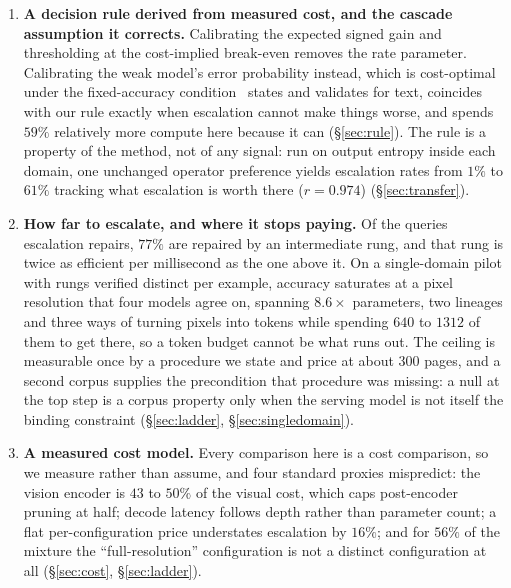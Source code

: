 \documentclass[10pt,twocolumn]{article}
\theoremstyle{plain}
\begin{document}
\begin{enumerate}
  \item \textbf{A decision rule derived from measured cost, and the cascade
  assumption it corrects.} Calibrating the expected signed gain and thresholding at the
  cost-implied break-even removes the rate parameter. Calibrating the weak
  model's error probability instead, which is cost-optimal under the fixed-accuracy
  condition~\cite{ucci} states and validates for text, coincides with
  our rule exactly when escalation cannot make things worse, and spends $59\%$
  relatively more compute here because it can (\S\ref{sec:rule}). The rule is a
  property of the method, not of any signal: run on output entropy inside each
  domain, one unchanged operator preference yields escalation rates from $1\%$
  to $61\%$ tracking what escalation is worth there ($r = 0.974$)
  (\S\ref{sec:transfer}).
  \item \textbf{How far to escalate, and where it stops paying.} Of the queries
  escalation repairs, $77\%$ are repaired by an intermediate rung, and that rung
  is twice as efficient per millisecond as the one above it. On a
  single-domain pilot with rungs verified distinct per example, accuracy
  saturates at a pixel resolution that four models agree on, spanning
  $8.6\times$ parameters, two lineages and three ways of turning pixels into
  tokens while spending $640$ to $1312$ of them to get there, so a token budget
  cannot be what runs out. The ceiling is measurable once by a procedure we
  state and price at about $300$ pages, and a second corpus supplies the
  precondition that procedure was missing: a null at the top step is a corpus
  property only when the serving model is not itself the binding constraint
  (\S\ref{sec:ladder}, \S\ref{sec:singledomain}).
  \item \textbf{A measured cost model.} Every comparison here is a cost
  comparison, so we measure rather than assume, and four standard proxies
  mispredict: the vision encoder is $43$ to $50\%$ of the visual cost, which
  caps post-encoder pruning at half; decode latency follows depth rather than
  parameter count; a flat per-configuration price understates escalation by
  $16\%$; and for $56\%$ of the mixture the ``full-resolution'' configuration is
  not a distinct configuration at all (\S\ref{sec:cost}, \S\ref{sec:ladder}).
\end{enumerate}
\end{document}
